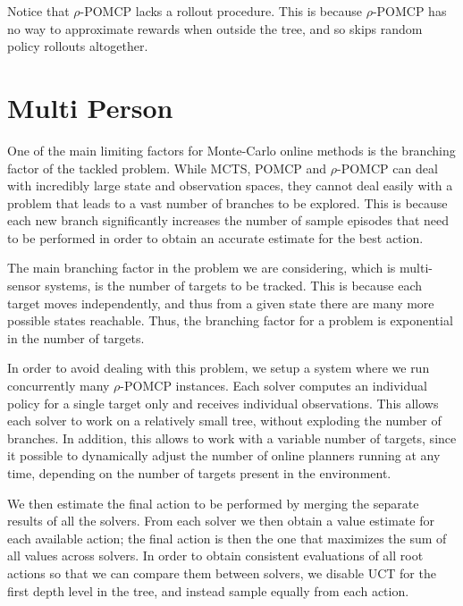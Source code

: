 Notice that $\rho$-POMCP lacks a rollout procedure. This is because $\rho$-POMCP has no way to
approximate rewards when outside the tree, and so skips random policy rollouts altogether.

\section{Multi Person}

One of the main limiting factors for Monte-Carlo online methods is the branching factor of the
tackled problem. While MCTS, POMCP and $\rho$-POMCP can deal with incredibly large state and
observation spaces, they cannot deal easily with a problem that leads to a vast number of branches
to be explored. This is because each new branch significantly increases the number of sample
episodes that need to be performed in order to obtain an accurate estimate for the best action.

The main branching factor in the problem we are considering, which is multi-sensor systems, is the
number of targets to be tracked. This is because each target moves independently, and thus from a
given state there are many more possible states reachable. Thus, the branching factor for a problem
is exponential in the number of targets.

In order to avoid dealing with this problem, we setup a system where we run concurrently many
$\rho$-POMCP instances. Each solver computes an individual policy for a single target only and
receives individual observations. This allows each solver to work on a relatively small tree,
without exploding the number of branches. In addition, this allows to work with a variable number of
targets, since it possible to dynamically adjust the number of online planners running at any time,
depending on the number of targets present in the environment.

We then estimate the final action to be performed by merging the separate results of all the
solvers.  From each solver we then obtain a value estimate for each available action; the final
action is then the one that maximizes the sum of all values across solvers. In order to obtain
consistent evaluations of all root actions so that we can compare them between solvers, we disable
UCT for the first depth level in the tree, and instead sample equally from each action.
